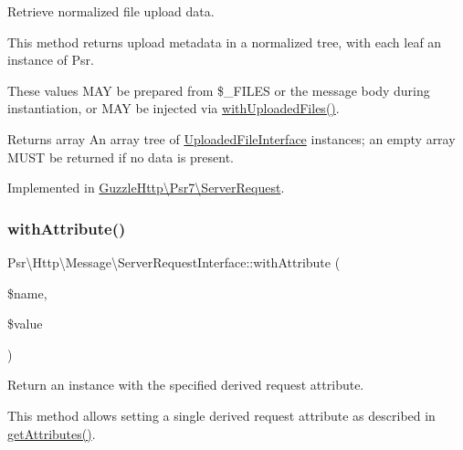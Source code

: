Retrieve normalized file upload data.

This method returns upload metadata in a normalized tree, with each leaf an instance of Psr.

These values M\+AY be prepared from \$\+\_\+\+F\+I\+L\+ES or the message body during instantiation, or M\+AY be injected via \hyperlink{interfacePsr_1_1Http_1_1Message_1_1ServerRequestInterface_aeab9588f1afa2cdccd04671260ecaec8}{with\+Uploaded\+Files()}.

\begin{DoxyReturn}{Returns}
array An array tree of \hyperlink{interfacePsr_1_1Http_1_1Message_1_1UploadedFileInterface}{Uploaded\+File\+Interface} instances; an empty array M\+U\+ST be returned if no data is present. 
\end{DoxyReturn}


Implemented in \hyperlink{classGuzzleHttp_1_1Psr7_1_1ServerRequest_ae76d19f748d553ee3aa8ec1c719d1efe}{Guzzle\+Http\textbackslash{}\+Psr7\textbackslash{}\+Server\+Request}.

\mbox{\label{interfacePsr_1_1Http_1_1Message_1_1ServerRequestInterface_a1c7b69d585708476be91642b752d5478}} 
\subsubsection{\texorpdfstring{with\+Attribute()}{withAttribute()}}
{\footnotesize\ttfamily Psr\textbackslash{}\+Http\textbackslash{}\+Message\textbackslash{}\+Server\+Request\+Interface\+::with\+Attribute (\begin{DoxyParamCaption}\item[{}]{\$name,  }\item[{}]{\$value }\end{DoxyParamCaption})}

Return an instance with the specified derived request attribute.

This method allows setting a single derived request attribute as described in \hyperlink{interfacePsr_1_1Http_1_1Message_1_1ServerRequestInterface_a0cda25a9b297c86e7813ffcb98ceb3df}{get\+Attributes()}.

